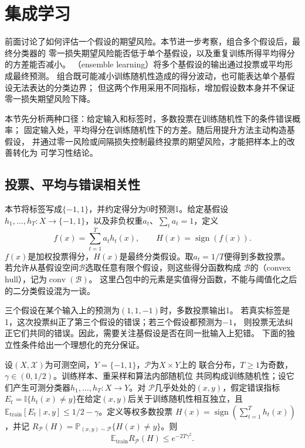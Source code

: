 \section{集成学习}
\label{sec:boosting}

前面讨论了如何评估一个假设的期望风险。本节进一步考察，组合多个假设后，最终分类器的
零一损失期望风险能否低于单个基假设，以及重复训练所得平均得分的方差能否减小。
（ensemble learning）将多个基假设的输出通过投票或平均形成最终预测。
组合既可能减小训练随机性造成的得分波动，也可能表达单个基假设无法表达的分类边界；
但这两个作用采用不同指标，增加假设数本身并不保证零一损失期望风险下降。

本节先分析两种口径：给定输入和标签时，多数投票在训练随机性下的条件错误概率；
固定输入处，平均得分在训练随机性下的方差。随后用提升方法主动构造基假设，
并通过零一风险或间隔损失控制最终投票的期望风险，才能把样本上的改善转化为
可学习性结论。

\subsection{投票、平均与错误相关性}

本节将标签写成$\{-1,1\}$，并约定得分为0时预测1。给定基假设
$h_1,\ldots,h_T:X\to\{-1,1\}$，以及非负权重$a_t$、$\sum_ta_t=1$，定义
\[
 f(x)=\sum_{t=1}^T a_t h_t(x),\qquad H(x)=\operatorname{sign}(f(x)).
\]
$f(x)$是加权投票得分，$H(x)$是最终分类假设。取$a_t=1/T$便得到多数投票。
若允许从基假设空间$\mathcal B$选取任意有限个假设，则这些得分函数构成
$\mathcal B$的（convex hull），记为$\operatorname{conv}(\mathcal B)$。
这里凸包中的元素是实值得分函数，不能与阈值化之后的二分类假设混为一谈。

三个假设在某个输入上的预测为$(1,1,-1)$时，多数投票输出1。
若真实标签是1，这次投票纠正了第三个假设的错误；若三个假设都预测为$-1$，
则投票无法纠正它们共同的错误。因此，需要关注基假设是否在同一批输入上犯错。
下面的独立性条件给出一个理想化的充分保证。

\begin{theorem}[独立错误下的多数投票]
\label{thm:independent-majority-vote}
设$(X,\mathcal X)$为可测空间，$Y=\{-1,1\}$，$\mathcal P$为$X\times Y$上的
联合分布，$T\geq1$为奇数，$\gamma\in(0,1/2)$。训练样本、重采样和算法内部随机位
共同构成训练随机性；设它们产生可测分类器$h_1,\ldots,h_T:X\to Y$。对
$\mathcal P$几乎处处的$(x,y)$，假定错误指标
$E_t=\mathbb I\{h_t(x)\neq y\}$在给定$(x,y)$后关于训练随机性相互独立，且
$\mathbb E_{\mathrm{train}}[E_t\mid x,y]\leq1/2-\gamma$。定义等权多数投票
$H(x)=\operatorname{sign}(\sum_{t=1}^T h_t(x))$，并记
$R_{\mathcal P}(H)=\mathbb P_{(x,y)\sim\mathcal P}\{H(x)\neq y\}$。则
\[
 \mathbb E_{\mathrm{train}}R_{\mathcal P}(H)\leq e^{-2T\gamma^2}.
\]
\end{theorem}

